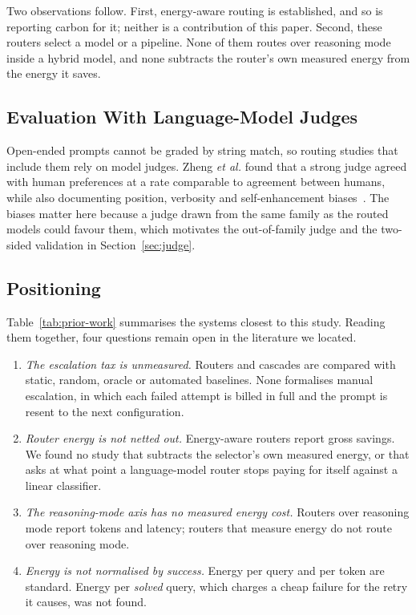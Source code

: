 Two observations follow. First, energy-aware routing is established, and so
is reporting carbon for it; neither is a contribution of this paper. Second,
these routers select a model or a pipeline. None of them routes over
reasoning mode inside a hybrid model, and none subtracts the router's own
measured energy from the energy it saves.

\subsection{Evaluation With Language-Model Judges}
\label{sec:lit-judges}

Open-ended prompts cannot be graded by string match, so routing studies that
include them rely on model judges. Zheng \emph{et al.} found that a strong
judge agreed with human preferences at a rate comparable to agreement between
humans, while also documenting position, verbosity and self-enhancement
biases~\cite{zheng2023judging}. The biases matter here because a judge drawn
from the same family as the routed models could favour them, which motivates
the out-of-family judge and the two-sided validation in
Section~\ref{sec:judge}.

\subsection{Positioning}
\label{sec:lit-gap}

Table~\ref{tab:prior-work} summarises the systems closest to this study.
Reading them together, four questions remain open in the literature we
located.

\begin{enumerate}
  \item \emph{The escalation tax is unmeasured.} Routers and cascades are
        compared with static, random, oracle or automated baselines. None
        formalises manual escalation, in which each failed attempt is billed
        in full and the prompt is resent to the next configuration.
  \item \emph{Router energy is not netted out.} Energy-aware routers report
        gross savings. We found no study that subtracts the selector's own
        measured energy, or that asks at what point a language-model router
        stops paying for itself against a linear classifier.
  \item \emph{The reasoning-mode axis has no measured energy cost.} Routers
        over reasoning mode report tokens and latency; routers that measure
        energy do not route over reasoning mode.
  \item \emph{Energy is not normalised by success.} Energy per query and per
        token are standard. Energy per \emph{solved} query, which charges a
        cheap failure for the retry it causes, was not found.
\end{enumerate}

